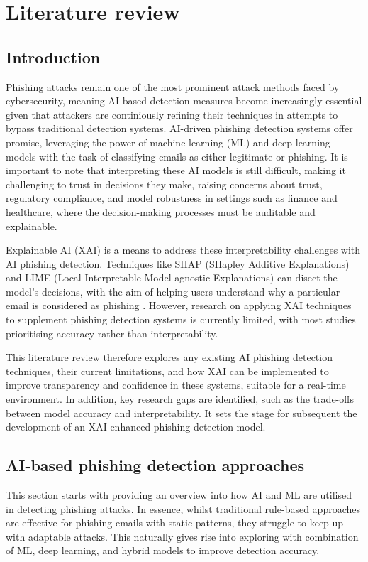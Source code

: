 \section{Literature review}

\subsection*{Introduction}
Phishing attacks remain one of the most prominent attack methods faced by cybersecurity, meaning AI-based detection measures become increasingly essential given that attackers are continiously refining their techniques in attempts to bypass traditional detection systems. AI-driven phishing detection systems offer promise, leveraging the power of machine learning (ML) and deep learning models with the task of classifying emails as either legitimate or phishing. It is important to note that interpreting these AI models is still difficult, making it challenging to trust in decisions they make, raising concerns about trust, regulatory compliance, and model robustness in settings such as finance and healthcare, where the decision-making processes must be auditable and explainable.\newline

\noindent Explainable AI (XAI) is a means to address these interpretability challenges with AI phishing detection. Techniques like SHAP (SHapley Additive Explanations) and LIME (Local Interpretable Model-agnostic Explanations) can disect the model's decisions, with the aim of helping users understand why a particular email is considered as phishing \citep{lundberg2017unified}. However, research on applying XAI techniques to supplement phishing detection systems is currently limited, with most studies prioritising accuracy rather than interpretability.\newline

\noindent This literature review therefore explores any existing AI phishing detection techniques, their current limitations, and how XAI can be implemented to improve transparency and confidence in these systems, suitable for a real-time environment. In addition, key research gaps are identified, such as the trade-offs between model accuracy and interpretability. It sets the stage for subsequent the development of an XAI-enhanced phishing detection model.

\newpage

\subsection*{AI-based phishing detection approaches}
This section starts with providing an overview into how AI and ML are utilised in detecting phishing attacks. In essence, whilst traditional rule-based approaches are effective for phishing emails with static patterns, they struggle to keep up with adaptable attacks. This naturally gives rise into exploring with combination of ML, deep learning, and hybrid models to improve detection accuracy.


